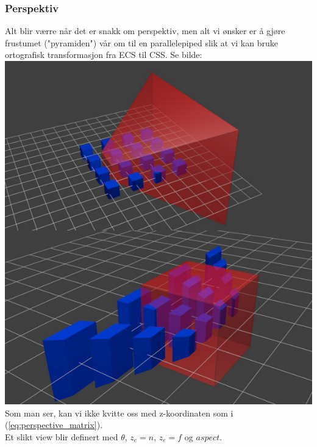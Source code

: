 \subsubsection{Perspektiv}
Alt blir værre når det er snakk om perspektiv, men alt vi ønsker er å gjøre frustumet ("pyramiden") vår om til en parallelepiped slik at vi kan bruke ortografisk transformasjon fra ECS til CSS. Se bilde:
\\ \includegraphics[width=\textwidth]{Bilder/projection_matrix.png}
Som man ser, kan vi ikke kvitte oss med z-koordinaten som i (\ref{eq:perspective_matrix}).
\\ Et slikt view blir definert med $\theta$, $z_e = n$, $z_e = f$ og $aspect$.

